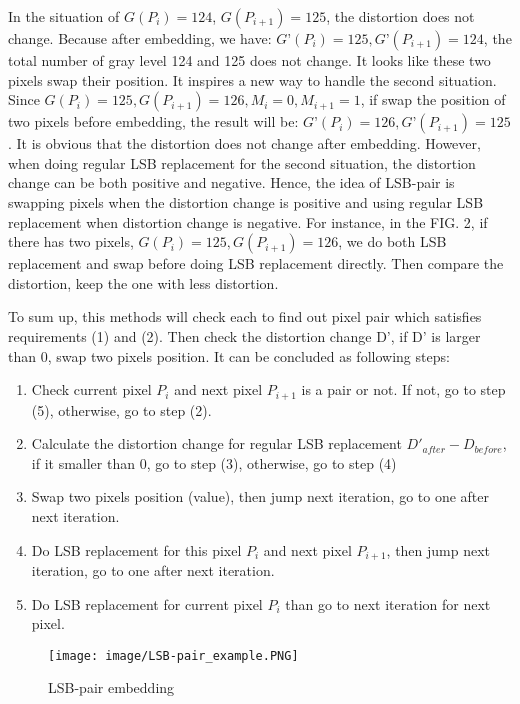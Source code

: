 \documentclass[%
    reprint,
    amsmath,amssymb,
    aps,
   ]{revtex4-1}
\begin{document}
   In the situation of \(G(P_{i}) = 124\), \(G(P_{i+1}) = 125\), the distortion does not change. Because after embedding, we have: \(G’(P_{i}) = 125, G’(P_{i+1}) = 124\), the total number of gray level 124 and 125 does not change. It looks like these two pixels swap their position. It inspires a new way to handle the second situation. Since \(G(P_{i}) = 125, G(P_{i+1}) = 126, M_{i} = 0, M_{i+1} = 1\), if swap the position of two pixels before embedding, the result will be: \(G’(P_{i}) = 126, G’(P_{i+1}) = 125\). It is obvious that the distortion does not change after embedding. However, when doing regular LSB replacement for the second situation, the distortion change can be both positive and negative. Hence, the idea of LSB-pair is swapping pixels when the distortion change is positive and using regular LSB replacement when distortion change is negative. For instance, in the FIG. 2, if there has two pixels, \(G(P_{i}) = 125, G(P_{i+1}) = 126\), we do both LSB replacement and swap before doing LSB replacement directly. Then compare the distortion, keep the one with less distortion. 
   
   To sum up, this methods will check each to find out pixel pair which satisfies requirements (1) and (2). Then check the distortion change D’, if D’ is larger than 0, swap two pixels position. It can be concluded as following steps:
   \begin{enumerate}
   \item Check current pixel \(P_{i}\) and next pixel \(P_{i+1}\) is a pair or not. If not, go to step (5), otherwise, go to step (2).
   \item Calculate the distortion change for regular LSB replacement \(D'_{after} - D_{before}\), if it smaller than 0, go to step (3), otherwise, go to step (4)
   \item Swap two pixels position (value), then jump next iteration, go to one after next iteration.
   \item Do LSB replacement for this pixel \(P_{i}\) and next pixel \(P_{i+1}\), then jump next iteration, go to one after next iteration.
   \item Do LSB replacement for current pixel \(P_{i}\) than go to next iteration for next pixel.
   \end{enumerate}
   
   
   \begin{figure}[h]
   \texttt{[image: image/LSB-pair\_example.PNG]}
   \caption{LSB-pair embedding}
   \label{fig:figure}
   \end{figure}
   
\end{document}
